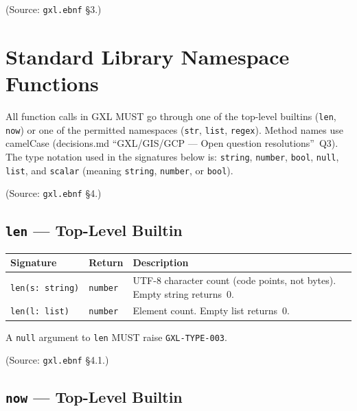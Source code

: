 (Source: \texttt{gxl.ebnf} \S3.)

\section{Standard Library Namespace Functions}
\label{sec:gxl:stdlib}

All function calls in GXL MUST go through one of the top-level builtins
(\texttt{len}, \texttt{now}) or one of the permitted namespaces
(\texttt{str}, \texttt{list}, \texttt{regex}).
Method names use camelCase
(decisions.md ``GXL/GIS/GCP --- Open question resolutions''~Q3).
The type notation used in the signatures below is:
\texttt{string}, \texttt{number}, \texttt{bool}, \texttt{null},
\texttt{list}, and \texttt{scalar} (meaning \texttt{string}, \texttt{number},
or \texttt{bool}).

(Source: \texttt{gxl.ebnf} \S4.)

\subsection{\texttt{len} --- Top-Level Builtin}
\label{subsec:gxl:stdlib:len}

\begin{center}
\begin{tabular}{p{5.5cm}p{1.5cm}p{6cm}}
\hline
\textbf{Signature} & \textbf{Return} & \textbf{Description} \\
\hline
\texttt{len(s:\ string)} & \texttt{number}
  & UTF-8 character count (code points, not bytes).
    Empty string returns~0. \\
\texttt{len(l:\ list)} & \texttt{number}
  & Element count. Empty list returns~0. \\
\hline
\end{tabular}
\end{center}

A \texttt{null} argument to \texttt{len} MUST raise \texttt{GXL-TYPE-003}.

(Source: \texttt{gxl.ebnf} \S4.1.)

\subsection{\texttt{now} --- Top-Level Builtin}
\label{subsec:gxl:stdlib:now}

